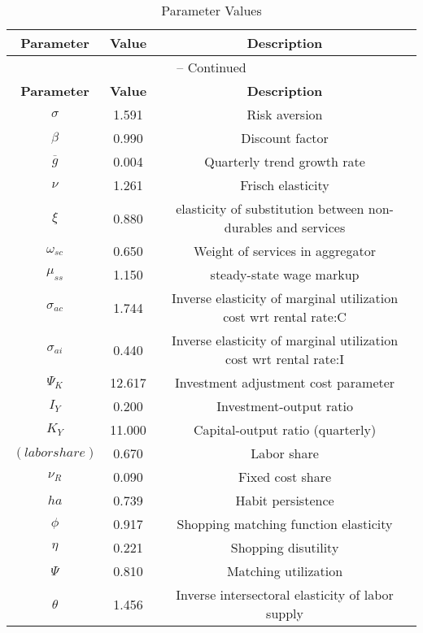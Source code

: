 \begin{center}
\begin{longtable}{ccc}
\caption{Parameter Values}\\%
\toprule%
\multicolumn{1}{c}{\textbf{Parameter}} &
\multicolumn{1}{c}{\textbf{Value}} &
 \multicolumn{1}{c}{\textbf{Description}}\\%
\midrule%
\endfirsthead
\multicolumn{3}{c}{{\tablename} \thetable{} -- Continued}\\%
\midrule%
\multicolumn{1}{c}{\textbf{Parameter}} &
\multicolumn{1}{c}{\textbf{Value}} &
  \multicolumn{1}{c}{\textbf{Description}}\\%
\midrule%
\endhead
${\sigma}$ 	 & 	 1.591 	 & 	 Risk aversion\\
${\beta}$ 	 & 	 0.990 	 & 	 Discount factor\\
${\overline{g}}$ 	 & 	 0.004 	 & 	 Quarterly trend growth rate\\
$\nu$ 	 & 	 1.261 	 & 	 Frisch elasticity\\
$\xi$ 	 & 	 0.880 	 & 	 elasticity of substitution between non-durables and services\\
$\omega_{sc}$ 	 & 	 0.650 	 & 	 Weight of services in aggregator\\
$\mu_{ss}$ 	 & 	 1.150 	 & 	 steady-state wage markup\\
${\sigma_{ac}}$ 	 & 	 1.744 	 & 	 Inverse elasticity of marginal utilization cost wrt rental rate:C\\
${\sigma_{ai}}$ 	 & 	 0.440 	 & 	 Inverse elasticity of marginal utilization cost wrt rental rate:I\\
${\Psi_{K}}$ 	 & 	 12.617 	 & 	 Investment adjustment cost parameter\\
${I_Y}$ 	 & 	 0.200 	 & 	 Investment-output ratio\\
${K_Y}$ 	 & 	 11.000 	 & 	 Capital-output ratio (quarterly)\\
$(labor share)$ 	 & 	 0.670 	 & 	 Labor share\\
${\nu_R}$ 	 & 	 0.090 	 & 	 Fixed cost share\\
${ha}$ 	 & 	 0.739 	 & 	 Habit persistence\\
${\phi}$ 	 & 	 0.917 	 & 	 Shopping matching function elasticity\\
${\eta}$ 	 & 	 0.221 	 & 	 Shopping disutility\\
${\Psi}$ 	 & 	 0.810 	 & 	 Matching utilization\\
${\theta}$ 	 & 	 1.456 	 & 	 Inverse intersectoral elasticity of labor supply\\

\end{longtable}
\end{center}
